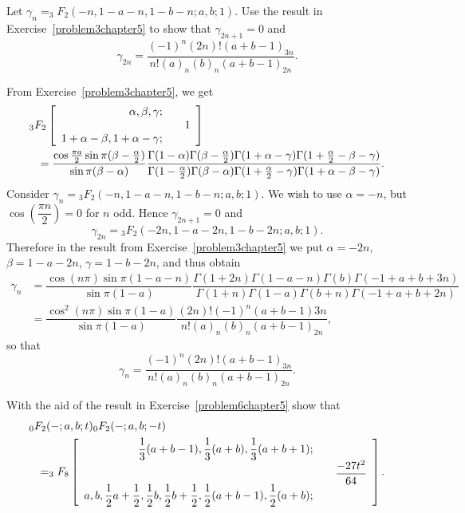 \begin{problem}\label{problem6chapter5}
Let $\gamma_n = _3F_2(-n,1-a-n,1-b-n;a,b;1).$ Use the result in Exercise~\ref{problem3chapter5} to show that $\gamma_{2n+1} = 0$ and 
$$\gamma_{2n} = \dfrac{(-1)^n (2n)! (a+b-1)_{3n}}{n!(a)_n(b)_n(a+b-1)_{2n}}.$$
\end{problem}
\begin{solution}
From Exercise~\ref{problem3chapter5}, we get
\begin{eqnarray*}
\lefteqn{{}_3F_2 \left[ \begin{array}{rlr}
\alpha, \beta, \gamma; & & \\
& & 1 \\
1+\alpha-\beta, 1+\alpha-\gamma ;
\end{array} \right]} \\
& & = \dfrac{\cos \frac{\pi a}{2} \sin \pi(\beta - \frac{\alpha}{2})}{\sin \pi(\beta - \alpha)} \dfrac{\Gamma(1-\alpha) \Gamma(\beta - \frac{\alpha}{2})\Gamma(1 + \alpha - \gamma) \Gamma(1 + \frac{\alpha}{2} - \beta - \gamma)}{\Gamma(1 - \frac{\alpha}{2})\Gamma(\beta - \alpha) \Gamma(1 + \frac{\alpha}{2} - \gamma)\Gamma(1 + \alpha - \beta - \gamma)}.
\end{eqnarray*}
Consider $\gamma_n ={}_3F_2(-n, 1-a-n, 1-b-n; a,b;1).$ We wish to use $\alpha = -n$, but $\cos \left( \dfrac{\pi n}{2} \right) = 0$ for $n$ odd. Hence $\gamma_{2n+1}=0$ and 
$$\gamma_{2n} = {}_3F_2(-2n, 1-a-2n,1-b-2n;a,b;1).$$
Therefore in the result from Exercise~\ref{problem3chapter5} we put $\alpha = -2n$, $\beta = 1-a-2n$, $\gamma=1-b-2n$, and thus obtain
$$\begin{array}{ll}
\gamma_n &= \dfrac{\cos(n \pi)\sin \pi(1-a-n)}{\sin \pi(1-a)} \dfrac{\Gamma(1+2n)\Gamma(1-a-n) \Gamma(b) \Gamma(-1+a+b+3n)}{\Gamma(1+n) \Gamma(1-a) \Gamma(b+n) \Gamma(-1+a+b+2n)} \\
&= \dfrac{\cos^2(n \pi) \sin \pi(1-a)}{\sin \pi(1-a)} \dfrac{(2n)! (-1)^n (a+b-1) 3n}{n! (a)_n (b)_n (a+b-1)_{2n}},
\end{array}$$
so that 
$$\gamma_n = \dfrac{(-1)^n (2n)! (a+b-1)_{3n}}{n! (a)_n (b)_n (a+b-1)_{2n}}.$$
\end{solution}
\begin{problem}\label{problem7chapter5}
With the aid of the result in Exercise~\ref{problem6chapter5} show that
\begin{eqnarray*}
\lefteqn{{}_0F_2(-;a,b;t) _0F_2(-;a,b;-t)} \\
& &  = _3F_8 \left[ \begin{array}{rlr}
\dfrac{1}{3}(a+b-1), \dfrac{1}{3}(a+b), \dfrac{1}{3}(a+b+1); & & \\
& & \dfrac{-27t^2}{64} \\
a,b,\dfrac{1}{2}a+\dfrac{1}{2}, \dfrac{1}{2}b, \dfrac{1}{2}b + \dfrac{1}{2}, \dfrac{1}{2}(a+b-1), \dfrac{1}{2}(a+b); & &
\end{array} \right].
\end{eqnarray*}
\end{problem}
